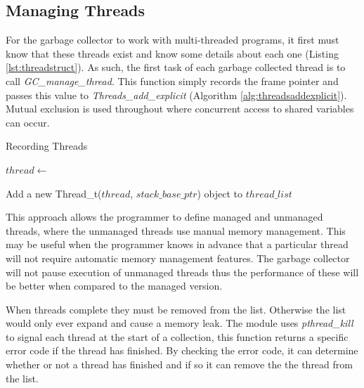 \documentclass[../diss.tex]{subfiles}
\begin{document}
\subsection{Managing Threads} \label{sec:threadsmanaging}

For the garbage collector to work with multi-threaded programs, it first must know that these threads exist and know some details about each one (Listing \ref{lst:threadstruct}). As such, the first task of each garbage collected thread is to call \emph{GC\_manage\_thread}. This function simply records the frame pointer and passes this value to \emph{Threads\_add\_explicit} (Algorithm \ref{alg:threadsaddexplicit}). Mutual exclusion is used throughout where concurrent access to shared variables can occur.

\begin{algorithm}
\caption{Recording Threads}
\label{alg:threadsaddexplicit}
\begin{algorithmic}


\State $thread\gets $ 

\State
\State {}

\State Add a new Thread\_t($thread$, $stack\_base\_ptr$) object to $thread\_list$

\State {}

\EndFunction

\end{algorithmic}
\end{algorithm}

This approach allows the programmer to define managed and unmanaged threads, where the unmanaged threads use manual memory management. This may be useful when the programmer knows in advance that a particular thread will not require automatic memory management features. The garbage collector will not pause execution of unmanaged threads thus the performance of these will be better when compared to the managed version.

When threads complete they must be removed from the list. Otherwise the list would only ever expand and cause a memory leak. The module uses \emph{pthread\_kill} to signal each thread at the start of a collection, this function returns a specific error code if the thread has finished. By checking the error code, it can determine whether or not a thread has finished and if so it can remove the the thread from the list. 
\end{document}
